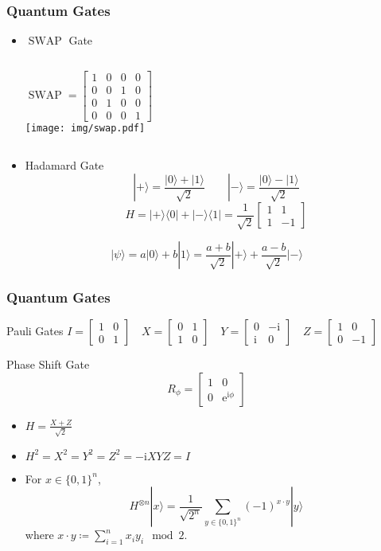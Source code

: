 \documentclass[UTF8,aspectratio=43,11pt,colorlinks,compress,openany]{beamer}%
\begin{document}
\begin{frame}\frametitle{Quantum Gates}
	\begin{itemize}
		\item $\operatorname{SWAP}$ Gate
		\begin{columns}
		\[\operatorname{SWAP} = \begin{bmatrix} 1&0&0&0\\0&0&1&0\\0&1&0&0\\0&0&0&1\end{bmatrix}\]
		\texttt{[image: img/swap.pdf]}
		\end{columns}
		\item Hadamard Gate
		\[|+\rangle=\frac{|0\rangle +|1\rangle}{\sqrt{2}}\qquad |-\rangle=\frac{|0\rangle -|1\rangle}{\sqrt{2}}\]
		\[H=|+\rangle\langle 0|+|-\rangle\langle 1| = \frac{1}{\sqrt{2}} \begin{bmatrix} 1 & 1 \\ 1 & -1 \end{bmatrix}\]
	\end{itemize}
	\[|\psi\rangle=a|0\rangle+b|1\rangle=\frac{a+b}{\sqrt{2}}|+\rangle+\frac{a-b}{\sqrt{2}}|-\rangle\]
\end{frame}

\begin{frame}\frametitle{Quantum Gates}
\setlength\abovedisplayskip{0pt}
\setlength\belowdisplayskip{0pt}
\begin{block}{Pauli Gates}
$I = \begin{bmatrix} 1 & 0 \\ 0 & 1\end{bmatrix}\quad
X = \begin{bmatrix} 0 & 1 \\ 1 & 0\end{bmatrix}\quad
Y = \begin{bmatrix} 0 & -\mathrm{i} \\ \mathrm{i} & 0\end{bmatrix}\quad
Z = \begin{bmatrix} 1 & 0 \\ 0 & -1\end{bmatrix}$
\end{block}
\begin{block}{Phase Shift Gate}
	\[R_{\phi}=
	\begin{bmatrix}
	1&0\\
	0&\mathrm{e}^{\mathrm{i}\phi}
	\end{bmatrix}\]
\end{block}
\begin{itemize}
	\item $H=\frac{X+Z}{\sqrt{2}}$
	\item $H^2=X^2=Y^2=Z^2=-\mathrm{i}XYZ=I$
	\item For $x\in\{0,1\}^n$,
\[H^{\otimes n}|x\rangle=\frac{1}{\sqrt{2^n}}\sum\limits_{y\in\{0,1\}^n}(-1)^{x\cdot y}|y\rangle\]
where $x\cdot y\coloneqq \sum\limits_{i=1}^n x_iy_i\mod 2$.
\end{itemize}
\end{frame}
\end{document}
